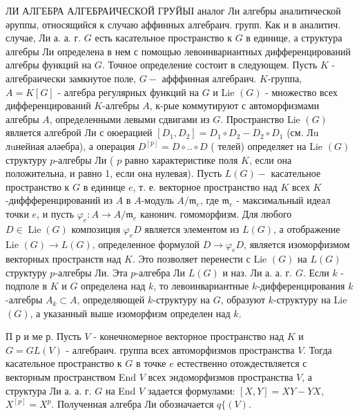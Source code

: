 \documentclass[10pt]{article}
\begin{document}
ЛИ АЛГЕБРА АЛГЕБРАИЧЕСКОЙ ГРУЙЫІ аналог Ли алгебры аналитической әруппы, относящийся к случаю аффинных алгебраич. групп. Как и в аналитич. случае, Ли а. а. г. $G$ есть касательное пространство к $G$ в единице, а структура алгебры Ли определена в нем с помощью левоинвариантных дифференцирований алгебры функций на $G$. Точное определение состоит в следующем. Пусть $K$ - алгебраически замкнутое поле, $G-$ афффинная алгебраич. $K$-группа, $A=K[G]$ - алгебра регулярных функций на $G$ и Lie $(G)$ - множество всех дифференцирований $K$-алгебры $A$, к-рые коммутируют с автоморфизмами алгебры $A$, определенными левыми сдвигами из $G$. Пространство Lie $(G)$ является алгеброй Ли с оюерацией $\left[D_{1}, D_{2}\right]=D_{1} \circ D_{2}-D_{2} \circ D_{1}$ (см. Лu лuнейная аләебра), а операция $D^{[p]}=D \circ . . \circ D$ ( телей) определяет на Lie $(G)$ структуру $p$-алгебры Ли ( $p$ равно характеристике поля $K$, если она положительна, и равно 1, если она нулевая). Пусть $L(G)-$ касательное пространство к $G$ в единице $e$, т. е. векторное пространство над $K$ всех $K$-диффференцирований из $A$ в $A$-модуль $A / \mathfrak{m}_{e}$, где $\mathfrak{m}_{e}$ - максимальный идеал точки $e$, и пусть $\varphi_{e}: A \rightarrow A / \mathfrak{m}_{e}$ канонич. гомоморфизм. Для любого $D \in \operatorname{Lie}(G)$ композиция $\varphi_{e} D$ является элементом из $L(G)$, а отображение Lie $(G) \rightarrow L(G)$, определенное формулой $D \rightarrow \varphi_{e} D$, является изоморфизмом векторных пространств над $K$. Это позволяет перенести с Lie $(G)$ на $L(G)$ структуру $p$-алгебры Ли. Эта $p$-алгебра Ли $L(G)$ и наз. Ли а. а. г. $G$. Если $k$ - подполе в $K$ и $G$ определена над $k$, то левоинвариантные $k$-дифференцирования $k$-алгебры $A_{k} \subset A$, определяющей $k$-структуру на $G$, образуют $k$-структуру на Lie $(G)$, а указанный выше изоморфизм определен над $k$.



П р и ме р. Пусть $V$ - конечномерное векторное пространство над $K$ и $G=G L(V)$ - алгебраич. группа всех автоморфизмов пространства $V$. Тогда касательное пространство к $G$ в точке $e$ естественно отождествляется с векторным пространством End $V$ всех эндоморфизмов пространства $V$, а структура Ли а. а. г. $G$ на End $V$ задается формулами: $[X, Y]=X Y-Y X$, $X^{[p]}=X^{p}$. Полученная алгебра Ли обозначается $q\{(V)$.
\end{document}
